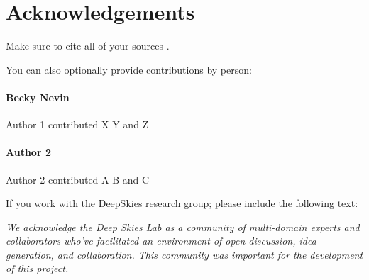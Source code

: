 \documentclass[twocolumn]{aastex631}
\newcommand{\editor}[1]{{\color{purple} #1}}
\begin{document}





\section {Acknowledgements}

Make sure to cite \cite{harris2020array} all of your sources \cite{Hunter:2007}.


You can also optionally provide contributions by person:

\paragraph{Becky Nevin}
Author 1 contributed X Y and Z

\paragraph{Author 2}
Author 2 contributed A B and C

If you work with the DeepSkies research group; please include the following text:

\emph{We acknowledge the Deep Skies Lab as a community of multi-domain experts and collaborators who’ve facilitated an environment of open discussion, idea-generation, and collaboration. This community was important for the development of this project.}






\end{document}
